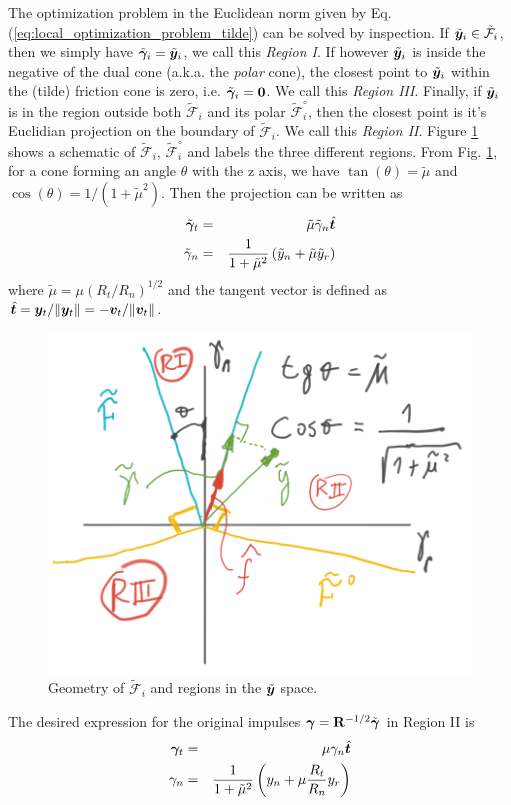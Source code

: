 The optimization problem in the Euclidean norm given by Eq.
(\ref{eq:local_optimization_problem_tilde}) can be solved by inspection. If
$\tilde{{\bm{y}}}_i\in\tilde{\mathcal{F}}_i$, then we simply have
$\tilde{{\bm\gamma}}_i = \tilde{{\bm{y}}}_i$, we call this \textit{Region I}. If
however $\tilde{{\bm{y}}}_i$ is inside the negative of the dual cone (a.k.a. the
\textit{polar} cone), the closest point to $\tilde{{\bm{y}}}_i$ within the (tilde)
friction cone is zero, i.e. $\tilde{{\bm\gamma}}_i ={\bm{0}}$. We call this
\textit{Region III}. Finally, if $\tilde{{\bm{y}}}_i$ is in the region outside
both $\tilde{\mathcal{F}}_i$ and its polar $\tilde{\mathcal{F}}_i^\circ$, then
the closest point is it's Euclidian projection on the boundary of
$\tilde{\mathcal{F}}_i$. We call this \textit{Region II}. Figure
\ref{fig:cone_regions} shows a schematic of $\tilde{\mathcal{F}}_i$,
$\tilde{\mathcal{F}}_i^\circ$ and labels the three different regions. From Fig.
\ref{fig:cone_regions}, for a cone forming an angle $\theta$ with the z axis, we
have $\tan(\theta)=\tilde\mu$ and $\cos(\theta)=1/(1+\tilde\mu^2)$. Then the
projection can be written as
\begin{eqnarray}
	\tilde{{\bm\gamma}}_t &=& \tilde{\mu}\tilde{\gamma}_n\hat{{\bm{t}}}\nonumber\\
	\tilde{\gamma}_n &=& \frac{1}{1+\tilde{\mu}^2}\left(\tilde{y}_n +
	\tilde{\mu}\tilde{y}_r\right)\nonumber		
\end{eqnarray}
where $\tilde\mu=\mu(R_t/R_n)^{1/2}$ and the tangent vector is defined as
$\hat{{\bm{t}}}={\bm{y}}_t/\Vert{\bm{y}}_t\Vert=-{\bm{v}}_t/\Vert{\bm{v}}_t\Vert$. 
\begin{figure}[!h]
    \centering
    \includegraphics[width=0.45\columnwidth]{figures/cone_regions.png}
    \caption{Geometry of $\tilde{\mathcal{F}}_i$ and regions in the
    $\tilde{{\bm{y}}}$ space.}
    \label{fig:cone_regions}
\end{figure}

The desired expression for the original impulses
${\bm\gamma}={\mathbf{R}}^{-1/2}\tilde{{\bm\gamma}}$ in Region II is
\begin{eqnarray}
	{\bm\gamma}_t &=& \mu\gamma_n\hat{{\bm{t}}}\nonumber\\
	\gamma_n &=& \frac{1}{1+\tilde\mu^2}\left(y_n +
	\mu\frac{R_t}{R_n}y_r\right)\nonumber		
\end{eqnarray}

